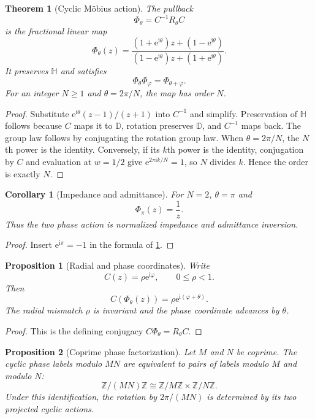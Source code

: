 \documentclass[11pt,letterpaper]{article}
\newtheorem{theorem}{Theorem}[section]
\theoremstyle{plain}
\newtheorem{proposition}[proposition]{Proposition}
\theoremstyle{plain}
\theoremstyle{plain}
\newtheorem{corollary}[corollary]{Corollary}
\theoremstyle{definition}
\theoremstyle{definition}
\theoremstyle{definition}
\theoremstyle{definition}
\theoremstyle{remark}
\theoremstyle{remark}
\theoremstyle{remark}
\theoremstyle{remark}
\newcommand{\ii}{\mathrm i}
\newcommand{\ZZ}{\mathbb Z}
\newcommand{\e}{\mathrm e}
\begin{document}
\begin{theorem}[Cyclic M\"obius action]\label{thm:cyclic_mobius}
The pullback
\[
\Phi_\theta
=C^{-1}R_\theta C
\]
is the fractional linear map
\[
\boxed{
\Phi_\theta(z)
=
\frac{(1+\e^{\ii\theta})z+(1-\e^{\ii\theta})}
{(1-\e^{\ii\theta})z+(1+\e^{\ii\theta})}.
}
\]
It preserves \(\mathbb H\) and satisfies
\[
\Phi_\theta\Phi_\varphi
=
\Phi_{\theta+\varphi}.
\]
For an integer \(N\geq1\) and \(\theta=2\pi/N\), the map has order \(N\).
\end{theorem}

\begin{proof}
Substitute \(\e^{\ii\theta}(z-1)/(z+1)\) into \(C^{-1}\) and simplify. Preservation of \(\mathbb H\) follows because \(C\) maps it to \(\mathbb D\), rotation preserves \(\mathbb D\), and \(C^{-1}\) maps back. The group law follows by conjugating the rotation group law. When \(\theta=2\pi/N\), the \(N\)th power is the identity. Conversely, if its \(k\)th power is the identity, conjugation by \(C\) and evaluation at \(w=1/2\) give \(\e^{2\pi\ii k/N}=1\), so \(N\) divides \(k\). Hence the order is exactly \(N\).
\end{proof}

\begin{corollary}[Impedance and admittance]\label{cor:impedance_admittance}
For \(N=2\), \(\theta=\pi\) and
\[
\Phi_\pi(z)=\frac1z.
\]
Thus the two phase action is normalized impedance and admittance inversion.
\end{corollary}

\begin{proof}
Insert \(\e^{\ii\pi}=-1\) in the formula of \cref{thm:cyclic_mobius}.
\end{proof}

\begin{proposition}[Radial and phase coordinates]\label{prop:radial_phase}
Write
\[
C(z)=\rho\e^{\ii\varphi},
\qquad
0\leq\rho<1.
\]
Then
\[
C(\Phi_\theta(z))
=
\rho\e^{\ii(\varphi+\theta)}.
\]
The radial mismatch \(\rho\) is invariant and the phase coordinate advances by \(\theta\).
\end{proposition}

\begin{proof}
This is the defining conjugacy \(C\Phi_\theta=R_\theta C\).
\end{proof}

\begin{proposition}[Coprime phase factorization]\label{prop:phase_factorization}
Let \(M\) and \(N\) be coprime. The cyclic phase labels modulo \(MN\) are equivalent to pairs of labels modulo \(M\) and modulo \(N\):
\[
\ZZ/(MN)\ZZ
\cong
\ZZ/M\ZZ\times\ZZ/N\ZZ.
\]
Under this identification, the rotation by \(2\pi/(MN)\) is determined by its two projected cyclic actions.
\end{proposition}
\end{document}
